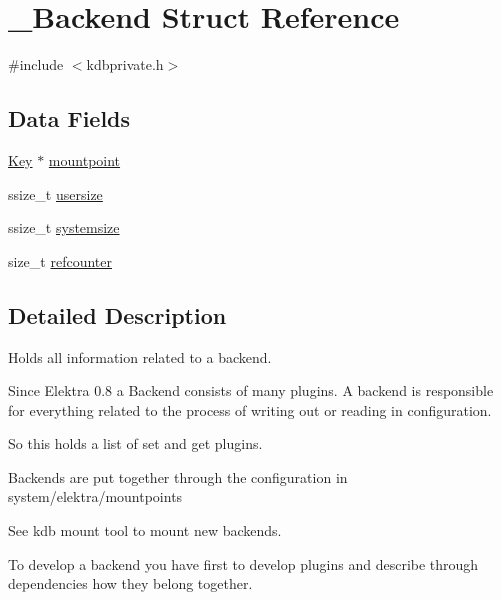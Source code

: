 \hypertarget{struct__Backend}{
\section{\_\-Backend Struct Reference}
\label{struct__Backend}
}


{\ttfamily \#include $<$kdbprivate.h$>$}

\subsection*{Data Fields}
\begin{DoxyCompactItemize}
\item 
\hyperlink{struct__Key}{Key} $\ast$ \hyperlink{struct__Backend_a5494dade5125f76ef8d77a24cdec1f84}{mountpoint}
\item 
ssize\_\-t \hyperlink{struct__Backend_a86eba6e73242d79efed2a313d25bdd76}{usersize}
\item 
ssize\_\-t \hyperlink{struct__Backend_a0af9c2bc4e327a17df20de41918d34cc}{systemsize}
\item 
size\_\-t \hyperlink{struct__Backend_a033b9df8d33fd2575bf26818fcce5bb4}{refcounter}
\end{DoxyCompactItemize}


\subsection{Detailed Description}
Holds all information related to a backend.

Since Elektra 0.8 a Backend consists of many plugins. A backend is responsible for everything related to the process of writing out or reading in configuration.

So this holds a list of set and get plugins.

Backends are put together through the configuration in system/elektra/mountpoints

See kdb mount tool to mount new backends.

To develop a backend you have first to develop plugins and describe through dependencies how they belong together. 

